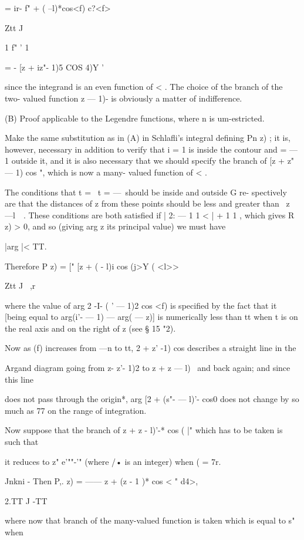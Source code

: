 {{= ir- f" + ( --l)*cos<f) c?<f>

Ztt J \

1 f" ' 1

= - [z + iz"- 1)5 COS 4)Y '

since the integrand is an even function of < . The choice of the
branch of the two- valued function z — 1)- is obviously a matter of
indifference.

(B) Proof applicable to the Legendre functions, where n is
um-estricted.

Make the same substitution as in (A) in Schlafli's integral defining
Pn z) ; it is, however, necessary in addition to verify that i = 1 is
inside the contour and = — 1 outside it, and it is also necessary that
we should specify the branch of [z + z" — 1) cos ", which is now a
many- valued function of < .

The conditions that t = \, t = —\ should be inside and outside G re-
spectively are that the distances of z from these points should be
less and greater than \ z —l\ \ . These conditions are both satisfied
if | 2: — 1 1 < | + 1 1 , which gives R z) > 0, and so (giving arg z
its principal value) we must have

|arg |< TT.

Therefore P z) = [" [z + ( - l)i cos (j>Y ( <l>>

Ztt J \ ,r

where the value of arg 2 -I- ( ' — 1)2 cos <f) is specified by the
fact that it [being equal to arg(i'- — 1) — arg( — z)] is numerically
less than tt when t is on the real axis and on the right of z (see §
15 "2).

Now as (f) increases from —n to tt, 2 + z' -1) cos describes a
straight line in the

Argand diagram going from z- z'- 1)2 to z + z — l)~ and back again;
and since this line

does not pass through the origin*, arg [2 + (s"- — l)'- cos0 does not
change by so much as 77 on the range of integration.

Now suppose that the branch of z + z - l)'-* cos ( |" which has to be
taken is such that

it reduces to z" e'""-'" (where /• is an integer) when ( = 7r.

Jnkni - Then P,. z) = —— z + (z - 1 )* cos < " d4>,

2.TT J -TT

where now that branch of the many-valued function is taken which is
equal to s" when

}}
